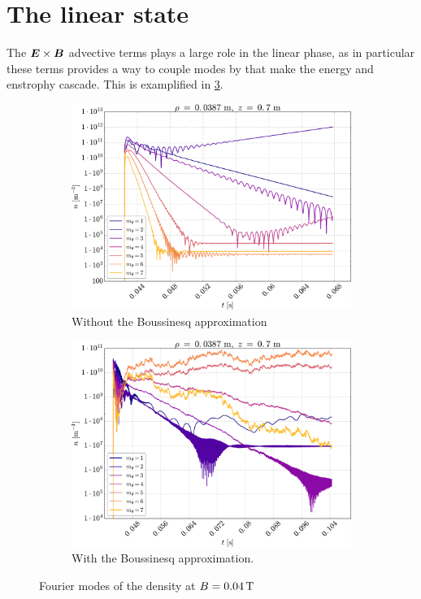\section{The linear state}
%
The $\boldsymbol{E}\times\boldsymbol{B}$ advective terms plays a large role in the linear phase, as in particular these terms provides a way to couple modes by that make the energy and enstrophy cascade.
This is examplified in \cref{fig:compFFTB}.
%
\begin{figure}[htbp]
    \centering
    \begin{subfigure}[h]{0.45\textwidth}
        \centering
        \includegraphics[width=1.0\textwidth]{fig/results/compareBouss/FFT004}
        \caption{Without the Boussinesq approximation}
        \label{fig:FFTWOB}
    \end{subfigure}%
    \hfill
    \begin{subfigure}[h]{0.45\textwidth}
        \centering
        \includegraphics[width=1.0\textwidth]{fig/results/compareBouss/FFT004B}
        \caption{With the Boussinesq approximation.}
        \label{fig:FFTWB}
    \end{subfigure}
    \caption{Fourier modes of the density at $B=0.04\, \text{T}$}
    \label{fig:compFFTB}
\end{figure}

